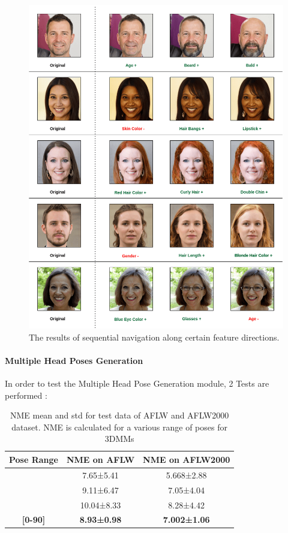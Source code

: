 \begin{figure}[H]
    \centering
    \includegraphics[width=\textwidth]{images/sequential-nav.png}
    \caption{The results of sequential navigation along certain feature directions.}
    \label{fig:nav_res}
\end{figure}

\paragraph{Multiple Head Poses Generation}

In order to test the Multiple Head Pose Generation module, 2 Tests are performed : \\

\begin{table}[H]
\caption{NME mean and std for test data of AFLW and AFLW2000 dataset. NME is calculated for a various range of poses for 3DMMs}
\centering
\begin{tabular}[t]{| c | c | c |}
\hline
Pose Range & NME on \textbf{AFLW} & NME on \textbf{AFLW2000} \\
\hline \hline
[0-30] & 7.65±5.41 & 5.668±2.88 \\
\hline
[30-60] & 9.11±6.47 & 7.05±4.04 \\
\hline
[30-90] & 10.04±8.33 & 8.28±4.42 \\
\hline
\textbf{[0-90]} & \textbf{8.93±0.98} & \textbf{7.002±1.06} \\
\hline
\end{tabular}
\label{nme_table}
\end{table}

